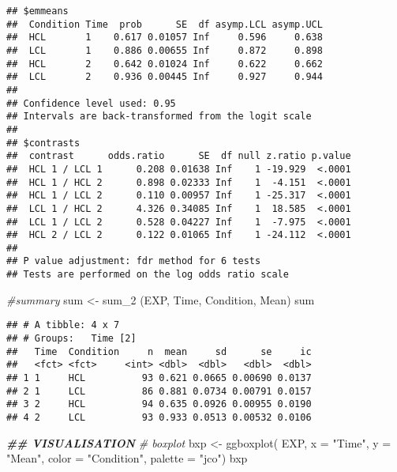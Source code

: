 \documentclass[
]{article}
\newenvironment{Shaded}{\begin{snugshade}}{\end{snugshade}}
\newcommand{\AttributeTok}[1]{\textcolor[rgb]{0.77,0.63,0.00}{#1}}
\newcommand{\CommentTok}[1]{\textcolor[rgb]{0.56,0.35,0.01}{\textit{#1}}}
\newcommand{\DocumentationTok}[1]{\textcolor[rgb]{0.56,0.35,0.01}{\textbf{\textit{#1}}}}
\newcommand{\FunctionTok}[1]{\textcolor[rgb]{0.00,0.00,0.00}{#1}}
\newcommand{\NormalTok}[1]{#1}
\newcommand{\OtherTok}[1]{\textcolor[rgb]{0.56,0.35,0.01}{#1}}
\newcommand{\StringTok}[1]{\textcolor[rgb]{0.31,0.60,0.02}{#1}}
\begin{document}
\begin{verbatim}
## $emmeans
##  Condition Time  prob      SE  df asymp.LCL asymp.UCL
##  HCL       1    0.617 0.01057 Inf     0.596     0.638
##  LCL       1    0.886 0.00655 Inf     0.872     0.898
##  HCL       2    0.642 0.01024 Inf     0.622     0.662
##  LCL       2    0.936 0.00445 Inf     0.927     0.944
## 
## Confidence level used: 0.95 
## Intervals are back-transformed from the logit scale 
## 
## $contrasts
##  contrast      odds.ratio      SE  df null z.ratio p.value
##  HCL 1 / LCL 1      0.208 0.01638 Inf    1 -19.929  <.0001
##  HCL 1 / HCL 2      0.898 0.02333 Inf    1  -4.151  <.0001
##  HCL 1 / LCL 2      0.110 0.00957 Inf    1 -25.317  <.0001
##  LCL 1 / HCL 2      4.326 0.34085 Inf    1  18.585  <.0001
##  LCL 1 / LCL 2      0.528 0.04227 Inf    1  -7.975  <.0001
##  HCL 2 / LCL 2      0.122 0.01065 Inf    1 -24.112  <.0001
## 
## P value adjustment: fdr method for 6 tests 
## Tests are performed on the log odds ratio scale
\end{verbatim}

\begin{Shaded}
\begin{Highlighting}[]
\CommentTok{\#summary }
\NormalTok{sum }\OtherTok{\textless{}{-}} \FunctionTok{sum\_2}\NormalTok{ (EXP, }\StringTok{\textquotesingle{}Time\textquotesingle{}}\NormalTok{, }\StringTok{\textquotesingle{}Condition\textquotesingle{}}\NormalTok{, }\StringTok{\textquotesingle{}Mean\textquotesingle{}}\NormalTok{)}
\NormalTok{sum}
\end{Highlighting}
\end{Shaded}

\begin{verbatim}
## # A tibble: 4 x 7
## # Groups:   Time [2]
##   Time  Condition     n  mean     sd      se     ic
##   <fct> <fct>     <int> <dbl>  <dbl>   <dbl>  <dbl>
## 1 1     HCL          93 0.621 0.0665 0.00690 0.0137
## 2 1     LCL          86 0.881 0.0734 0.00791 0.0157
## 3 2     HCL          94 0.635 0.0926 0.00955 0.0190
## 4 2     LCL          93 0.933 0.0513 0.00532 0.0106
\end{verbatim}

\begin{Shaded}
\begin{Highlighting}[]
\DocumentationTok{\#\# VISUALISATION}
\CommentTok{\# boxplot }
\NormalTok{bxp }\OtherTok{\textless{}{-}} \FunctionTok{ggboxplot}\NormalTok{(}
\NormalTok{  EXP, }\AttributeTok{x =} \StringTok{"Time"}\NormalTok{, }\AttributeTok{y =} \StringTok{"Mean"}\NormalTok{,}
  \AttributeTok{color =} \StringTok{"Condition"}\NormalTok{, }\AttributeTok{palette =} \StringTok{"jco"}\NormalTok{)}
\NormalTok{bxp}
\end{Highlighting}
\end{Shaded}
\end{document}
